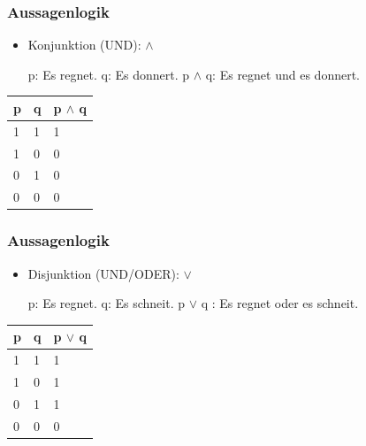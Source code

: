 \begin{frame}
\frametitle{Aussagenlogik}

\begin{itemize}
	\item Konjunktion (UND): $\land$
	
	\eal
		\ex p: Es regnet.
		\ex q: Es donnert.
		\ex p $\land$ q: Es regnet und es donnert.
	\zl

\end{itemize}
	

\begin{table}
\centering

\begin{tabular}{p{2cm}|p{2cm}|p{2cm}}
\textbf{p} & \textbf{q} & \textbf{p} $\land$ \textbf{q}\\
\hline
1 & 1 & 1\\
\hline
1 & 0 & 0\\
\hline
0 & 1 & 0\\
\hline 
0 & 0 & 0\\
\end{tabular}

\end{table}	

\end{frame}



\begin{frame}
\frametitle{Aussagenlogik}

\begin{itemize}
	\item Disjunktion (UND/ODER): $\lor$

	\eal
		\ex p: Es regnet.
		\ex q: Es schneit.
		\ex p $\lor$ q : Es regnet oder es schneit.
	\zl

\end{itemize}


\begin{table}
\centering

\begin{tabular}{p{2cm}|p{2cm}|p{2cm}}
\textbf{p} & \textbf{q} & \textbf{p} $\lor$ \textbf{q}\\
\hline
1 & 1 & 1\\
\hline
1 & 0 & 1\\
\hline
0 & 1 & 1\\
\hline 
0 & 0 & 0\\
\end{tabular}

\end{table}		

\end{frame}


